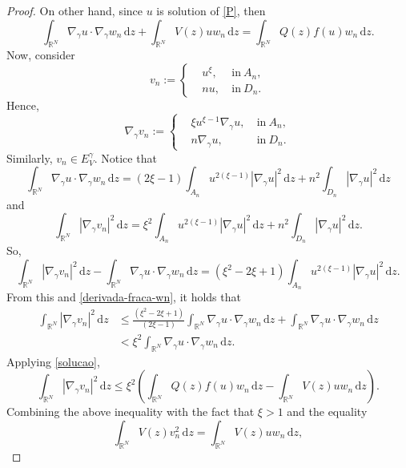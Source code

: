 \documentclass[12pt]{amsart}
\newcommand{\R}{\mathbb{R}}
\begin{document}
\begin{proof}
On other hand, since $u$ is solution of \eqref{P}, then
\begin{equation}\label{solucao}
		\int_{\mathbb{R}^N}\nabla_\gamma u \cdot\nabla_\gamma w_n\,\mathrm{d}z + \int_{\mathbb{R}^N}V(z)uw_n\,\mathrm{d}z 		= \int_{\R^N}Q(z)f(u)w_n\,\mathrm{d}z 	.
	\end{equation}
    Now, consider
	$$
	v_n:=\left\{
	\begin{aligned}
		& u^{\xi} ,\ &\mbox{in} \ A_n, \\
		&nu, \ &\mbox{in} \ D_n.
	\end{aligned}
	\right.
	$$
	Hence, 
	$$
	\nabla_\gamma v_n:=\left\{
	\begin{aligned}
		& \xi u^{\xi-1}\nabla_\gamma u ,\ &\mbox{in} \ A_n, \\
		&n\nabla_\gamma u, \ &\mbox{in} \ D_n.
	\end{aligned}
	\right.
	$$
	Similarly, $v_n \in E_V^\gamma$. Notice that
	\begin{equation}\label{derivada-fraca-wn}
		\int_{\mathbb{R}^N}\nabla_\gamma u \cdot \nabla_\gamma w_n\,\mathrm{d}z = (2\xi-1)\int_{A_n}u^{2(\xi-1)}|\nabla_{\gamma} u|^2\,\mathrm{d}z + n^2\int_{D_n}|\nabla_\gamma u|^2\,\mathrm{d}z
	\end{equation}
	and
    $$
	\int_{\mathbb{R}^N}|\nabla_{\gamma} v_n|^2\,\mathrm{d}z = \xi^2\int_{A_n}u^{2(\xi-1)}|\nabla_{\gamma} u|^2\,\mathrm{d}z + n^2\int_{D_n}|\nabla_\gamma u|^2\,\mathrm{d}z.
	$$
So,
	$$
	\int_{\mathbb{R}^N}|\nabla_{\gamma} v_n|^2\,\mathrm{d}z - \int_{\mathbb{R}^N}\nabla_\gamma u \cdot \nabla_\gamma w_n\,\mathrm{d}z = (\xi^2-2\xi+1)\int_{A_n}u^{2(\xi-1)}|\nabla_{\gamma} u|^2\,\mathrm{d}z.
	$$
From this and \eqref{derivada-fraca-wn}, it holds that
	$$
	\begin{aligned}
		\int_{\mathbb{R}^N}|\nabla_{\gamma} v_n|^2\,\mathrm{d}z &\leq \frac{(\xi^2-2\xi+1)}{(2\xi-1)}\int_{\mathbb{R}^N}\nabla_\gamma u \cdot \nabla_\gamma  w_n\,\mathrm{d}z + \int_{\mathbb{R}^N}\nabla_\gamma u \cdot \nabla_\gamma w_n\,\mathrm{d}z
		\\
		& < \xi^2\int_{\mathbb{R}^N}\nabla_\gamma u \cdot \nabla_\gamma w_n\,\mathrm{d}z.
	\end{aligned}
	$$
Applying \eqref{solucao},
    $$
	\int_{\mathbb{R}^N}|\nabla_{\gamma} v_n|^2\,\mathrm{d}z \leq \xi^2\left(	 \int_{\R^N}Q(z)f(u)w_n\,\mathrm{d}z - \int_{\mathbb{R}^N}V(z)uw_n\,\mathrm{d}z 	\right).
	$$	
Combining the above inequality with the fact that $\xi>1$ and the equality
	$$
	\int_{\mathbb{R}^N}V(z)v_n^2\,\mathrm{d}z = \int_{\mathbb{R}^N}V(z)uw_n\,\mathrm{d}z,
$$
\end{proof}
\end{document}
